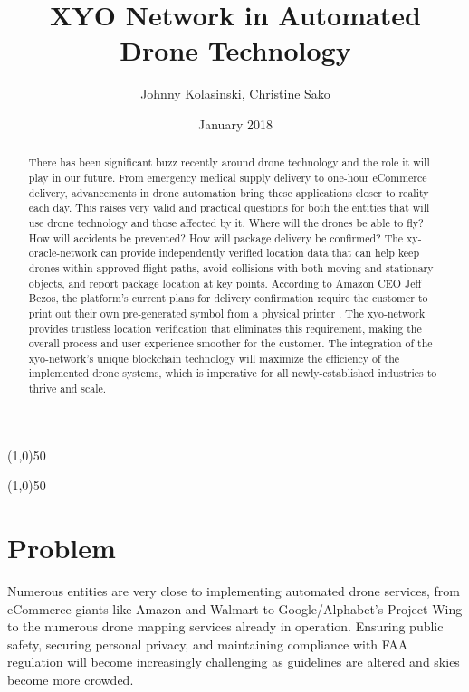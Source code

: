 \documentclass{article}
\title {XYO Network in Automated Drone Technology}
\author{Johnny Kolasinski, Christine Sako}
\date{January 2018}
\begin{document}
\maketitle
\tableofcontents

\begin{center}
\line(1,0){50}
\end{center}

\begin{abstract}
There has been significant buzz recently around drone technology and the role it will play in our future. From emergency medical supply delivery to one-hour eCommerce delivery, advancements in drone automation bring these applications closer to reality each day. This raises very valid and practical questions for both the entities that will use drone technology and those affected by it. Where will the drones be able to fly? How will accidents be prevented? How will package delivery be confirmed? The \Gls{xy-oracle-network} can provide independently verified location data that can help keep drones within approved flight paths, avoid collisions with both moving and stationary objects, and report package location at key points. According to Amazon CEO Jeff Bezos, the platform's current plans for delivery confirmation require the customer to print out their own pre-generated symbol from a physical printer \cite{nickelsburg-amazondrones}. The \Gls{xyo-network} provides \gls{trustless} location verification that eliminates this requirement, making the overall process and user experience smoother for the customer. The integration of the \Gls{xyo-network}'s unique blockchain technology will maximize the efficiency of the implemented drone systems, which is imperative for all newly-established industries to thrive and scale.

\end{abstract}

\begin{center}
\line(1,0){50}
\end{center}

\section {Problem}
Numerous entities are very close to implementing automated drone services, from eCommerce giants like Amazon and Walmart to Google/Alphabet's Project Wing to the numerous drone mapping services already in operation. Ensuring public safety, securing personal privacy, and maintaining compliance with FAA regulation will become increasingly challenging as guidelines are altered and skies become more crowded.
\end{document}
